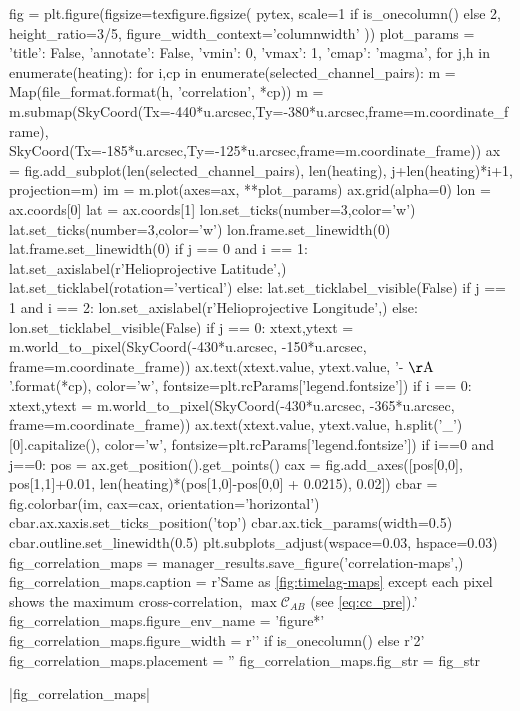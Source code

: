 \begin{pycode}
fig = plt.figure(figsize=texfigure.figsize(
    pytex,
    scale=1 if is_onecolumn() else 2,
    height_ratio=3/5,
    figure_width_context='columnwidth'
))
plot_params = {'title': False, 'annotate': False, 'vmin': 0, 'vmax': 1, 'cmap': 'magma',}
for j,h in enumerate(heating):
    for i,cp in enumerate(selected_channel_pairs):
        m = Map(file_format.format(h, 'correlation', *cp))
        m = m.submap(SkyCoord(Tx=-440*u.arcsec,Ty=-380*u.arcsec,frame=m.coordinate_frame),
                     SkyCoord(Tx=-185*u.arcsec,Ty=-125*u.arcsec,frame=m.coordinate_frame))
        ax = fig.add_subplot(len(selected_channel_pairs), len(heating), j+len(heating)*i+1,
                             projection=m)
        im = m.plot(axes=ax, **plot_params)
        ax.grid(alpha=0)
        lon = ax.coords[0]
        lat = ax.coords[1]
        lon.set_ticks(number=3,color='w')
        lat.set_ticks(number=3,color='w')
        lon.frame.set_linewidth(0)
        lat.frame.set_linewidth(0)
        if j == 0 and i == 1:
            lat.set_axislabel(r'Helioprojective Latitude',)
            lat.set_ticklabel(rotation='vertical')
        else:
            lat.set_ticklabel_visible(False)
        if j == 1 and i == 2:
            lon.set_axislabel(r'Helioprojective Longitude',)
        else:
            lon.set_ticklabel_visible(False)
        if j == 0:
            xtext,ytext = m.world_to_pixel(SkyCoord(-430*u.arcsec, -150*u.arcsec, frame=m.coordinate_frame))
            ax.text(xtext.value, ytext.value, '{}-{} $\mathrm{{\AA}}$'.format(*cp),
                    color='w', fontsize=plt.rcParams['legend.fontsize'])
        if i == 0:
            xtext,ytext = m.world_to_pixel(SkyCoord(-430*u.arcsec, -365*u.arcsec, frame=m.coordinate_frame))
            ax.text(xtext.value, ytext.value, h.split('_')[0].capitalize(),
                color='w', fontsize=plt.rcParams['legend.fontsize'])
        if i==0 and j==0:
            pos = ax.get_position().get_points()
            cax = fig.add_axes([pos[0,0], pos[1,1]+0.01, len(heating)*(pos[1,0]-pos[0,0] + 0.0215), 0.02])
            cbar = fig.colorbar(im, cax=cax, orientation='horizontal')
            cbar.ax.xaxis.set_ticks_position('top')
            cbar.ax.tick_params(width=0.5)
            cbar.outline.set_linewidth(0.5)
plt.subplots_adjust(wspace=0.03, hspace=0.03)
fig_correlation_maps = manager_results.save_figure('correlation-maps',)
fig_correlation_maps.caption = r'Same as \autoref{fig:timelag-maps} except each pixel shows the maximum cross-correlation, $\max\mathcal{C}_{AB}$ (see \autoref{eq:cc_pre}).'
fig_correlation_maps.figure_env_name = 'figure*'
fig_correlation_maps.figure_width = r'\columnwidth' if is_onecolumn() else r'2\columnwidth'
fig_correlation_maps.placement = ''
fig_correlation_maps.fig_str = fig_str
\end{pycode}
|fig_correlation_maps|

